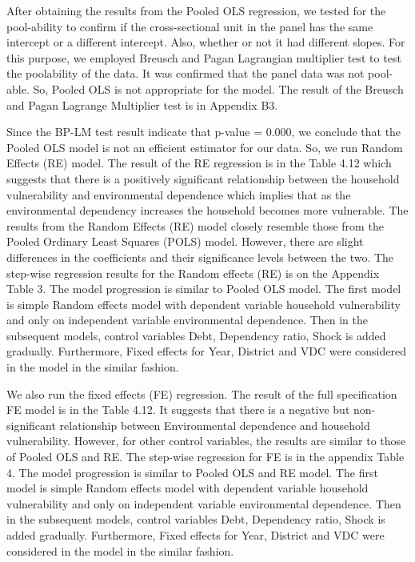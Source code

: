 After obtaining the results from the Pooled OLS regression, we tested for the pool-ability to confirm if the cross-sectional unit in the panel has the same intercept or a different intercept. Also, whether or not it had different slopes. For this purpose, we employed Breusch and Pagan Lagrangian multiplier test \citep{breusch1980lagrange} to test the poolability of the data. It was confirmed that the panel data was not pool-able. So, Pooled OLS is not appropriate for the model. The result of the Breusch and Pagan Lagrange Multiplier test is in Appendix B3.

Since the BP-LM test result indicate that p-value = 0.000, we conclude that the Pooled OLS model is not an efficient estimator for our data. So, we run Random Effects (RE) model. The result of the RE regression is in the Table 4.12 which suggests that there is a positively significant relationship between the household vulnerability and environmental dependence which implies that as the environmental dependency increases the household becomes more vulnerable. The results from the Random Effects (RE) model closely resemble those from the Pooled Ordinary Least Squares (POLS) model. However, there are slight differences in the coefficients and their significance levels between the two. The step-wise regression results for the Random effects (RE) is on the Appendix Table 3. The model progression is similar to Pooled OLS model. The first model is simple Random effects model with dependent variable household vulnerability and only on independent variable environmental dependence. Then in the subsequent models, control variables Debt, Dependency ratio, Shock is added gradually. Furthermore, Fixed effects for Year, District and VDC were considered in the model in the similar fashion. 

We also run the fixed effects (FE) regression. The result of the full specification FE model is in the Table 4.12. It suggests that there is a  negative but non-significant relationship between Environmental dependence and household vulnerability. However, for other control variables, the results are similar to those of Pooled OLS and RE. The step-wise regression for FE is in the appendix Table 4. The model progression is similar to Pooled OLS and RE model. The first model is simple Random effects model with dependent variable household vulnerability and only on independent variable environmental dependence. Then in the subsequent models, control variables Debt, Dependency ratio, Shock is added gradually. Furthermore, Fixed effects for Year, District and VDC were considered in the model in the similar fashion.      

